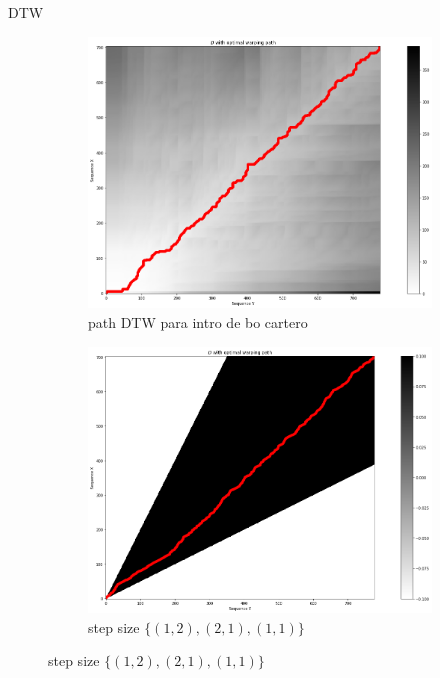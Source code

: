 \documentclass{beamer}
\begin{document}
\begin{frame}{DTW}
\begin{figure}
    \begin{subfigure}{0.49\textwidth}
        \centering
        \includegraphics[width=\textwidth]{dtw_bo_cartero.png}
        \caption{path DTW para intro de bo cartero}
    \end{subfigure}
    \hfill
    \begin{subfigure}{0.49\textwidth}
        \centering
        \includegraphics[width=\textwidth]{dtw_bo_cartero_step_size.png}
        \caption{step size $\{(1,2), (2,1), (1,1)\}$}
    \end{subfigure}
\end{figure}

\end{frame}
\end{document}
